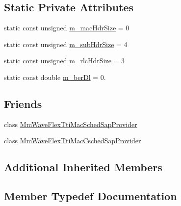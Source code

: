\subsection*{Static Private Attributes}
\begin{DoxyCompactItemize}
\item 
static const unsigned \hyperlink{classns3_1_1MmWaveFlexTtiMacScheduler_a4f51deebfee8f21e01647d3812c17929}{m\+\_\+mac\+Hdr\+Size} = 0
\item 
static const unsigned \hyperlink{classns3_1_1MmWaveFlexTtiMacScheduler_ac2c5c229b7350214b5ff56c2a9167020}{m\+\_\+sub\+Hdr\+Size} = 4
\item 
static const unsigned \hyperlink{classns3_1_1MmWaveFlexTtiMacScheduler_a2c5b4f384597954f87952522bd1fa94f}{m\+\_\+rlc\+Hdr\+Size} = 3
\item 
static const double \hyperlink{classns3_1_1MmWaveFlexTtiMacScheduler_ab18aea68e8746a7584be41c0cc66218c}{m\+\_\+ber\+Dl} = 0.
\end{DoxyCompactItemize}
\subsection*{Friends}
\begin{DoxyCompactItemize}
\item 
class \hyperlink{classns3_1_1MmWaveFlexTtiMacScheduler_a659e913fedbe23f1d3bb4e642212ea32}{Mm\+Wave\+Flex\+Tti\+Mac\+Sched\+Sap\+Provider}
\item 
class \hyperlink{classns3_1_1MmWaveFlexTtiMacScheduler_a96a50df5c19790a6de7fa5203974e459}{Mm\+Wave\+Flex\+Tti\+Mac\+Csched\+Sap\+Provider}
\end{DoxyCompactItemize}
\subsection*{Additional Inherited Members}


\subsection{Member Typedef Documentation}

